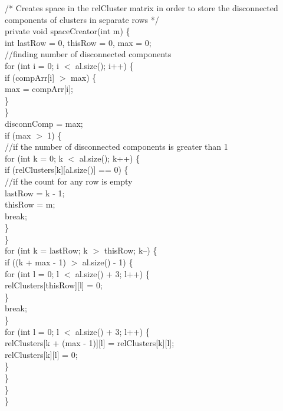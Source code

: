\begin{ttfamily   }
\begin{scriptsize}
    \noindent /*
      Creates space in the relCluster matrix in order to store the disconnected components of clusters
      in separate rows
     */\\
    private void spaceCreator(int m) \{\\
        int lastRow = 0, thisRow = 0, max = 0;\\
        \noindent//finding number of disconnected components\\
        \noindent for (int i = 0;   i $<$ al.size();   i++) \{\\
            if (compArr[i] $>$ max) \{\\
                max = compArr[i];\\
            \}\\
        \}\\
        disconnComp = max;\\
        if (max $>$ 1) \{\\\noindent//if the number of disconnected components is greater than 1\\
            \noindent for (int k = 0;   k $<$ al.size();   k++) \{\\
                if (relClusters[k][al.size()] == 0) \{\\\noindent//if the count for any row is empty\\
                    lastRow = k - 1;\\
                    thisRow = m;\\
                    break;\\
                \}\\
            \}\\

            \noindent for (int k = lastRow;   k $>$ thisRow;   k--) \{\\
                if ((k + max - 1) $>$ al.size() - 1) \{\\
                    \noindent for (int l = 0; l $<$ al.size() + 3; l++) \{\\
                        relClusters[thisRow][l] = 0;\\
                    \}\\
                    break;\\
                \}\\
                \noindent for (int l = 0; l $<$ al.size() + 3; l++) \{\\
                    relClusters[k + (max - 1)][l] = relClusters[k][l];\\
                    relClusters[k][l] = 0;\\
                \}\\
            \}\\
        \}\\
    \}\\


\end{scriptsize}
\end{ttfamily   }
